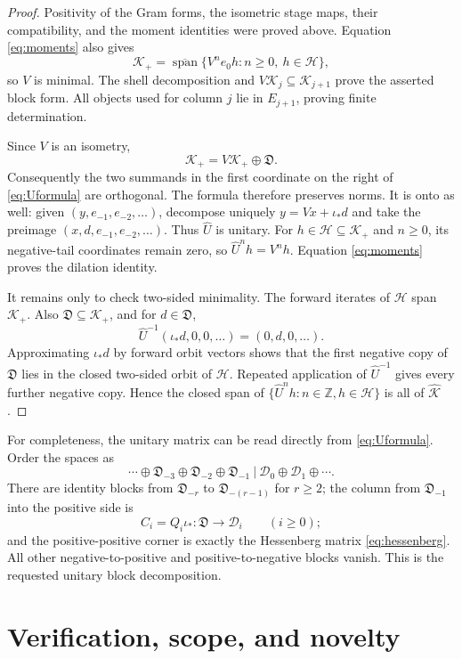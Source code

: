 \documentclass[11pt]{article}
\newcommand{\Hh}{\mathcal H}
\newcommand{\Kp}{\mathcal K_+}
\newcommand{\spann}{\operatorname{span}}
\begin{document}
\begin{proof}
Positivity of the Gram forms, the isometric stage maps, their compatibility,
and the moment identities were proved above.  Equation
\eqref{eq:moments} also gives
\[
 \Kp=\overline{\spann}\{V^ne_0h:n\geq0,\ h\in\Hh\},
\]
so $V$ is minimal.  The shell decomposition and
$V\mathcal K_j\subseteq\mathcal K_{j+1}$ prove the asserted block form.
All objects used for column $j$ lie in $E_{j+1}$, proving finite
determination.

Since $V$ is an isometry,
\[
 \Kp=V\Kp\oplus\mathfrak D.
\]
Consequently the two summands in the first coordinate on the right of
\eqref{eq:Uformula} are orthogonal.  The formula therefore preserves norms.
It is onto as well: given $(y,e_{-1},e_{-2},\ldots)$, decompose uniquely
$y=Vx+\iota_*d$ and take the preimage
$(x,d,e_{-1},e_{-2},\ldots)$.  Thus $\widehat U$ is unitary.  For
$h\in\Hh\subseteq\Kp$ and $n\geq0$, its negative-tail coordinates
remain zero, so $\widehat U^nh=V^nh$.  Equation \eqref{eq:moments}
proves the dilation identity.

It remains only to check two-sided minimality.  The forward iterates of
$\Hh$ span $\Kp$.  Also $\mathfrak D\subseteq\Kp$, and for
$d\in\mathfrak D$,
\[
 \widehat U^{-1}(\iota_*d,0,0,\ldots)=(0,d,0,\ldots).
\]
Approximating $\iota_*d$ by forward orbit vectors shows that the first
negative copy of $\mathfrak D$ lies in the closed two-sided orbit of
$\Hh$.  Repeated application of $\widehat U^{-1}$ gives every further
negative copy.  Hence the closed span of
$\{\widehat U^nh:n\in\mathbb Z,h\in\Hh\}$ is all of
$\widehat{\mathcal K}$.
\end{proof}

For completeness, the unitary matrix can be read directly from
\eqref{eq:Uformula}.  Order the spaces as
\[
 \cdots\oplus\mathfrak D_{-3}\oplus\mathfrak D_{-2}
 \oplus\mathfrak D_{-1}\ \big|\
 \mathcal D_0\oplus\mathcal D_1\oplus\cdots.
\]
There are identity blocks from $\mathfrak D_{-r}$ to
$\mathfrak D_{-(r-1)}$ for $r\geq2$; the column from
$\mathfrak D_{-1}$ into the positive side is
\[
 C_i=Q_i\iota_*:\mathfrak D\to\mathcal D_i\qquad(i\geq0);
\]
and the positive-positive corner is exactly the Hessenberg matrix
\eqref{eq:hessenberg}.  All other negative-to-positive and
positive-to-negative blocks vanish.  This is the requested unitary block
decomposition.

\section{Verification, scope, and novelty}
\end{document}
